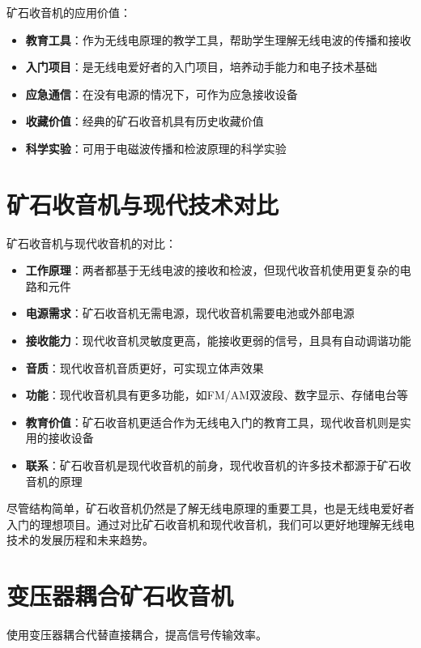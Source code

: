 \documentclass[12pt,UTF8]{ctexbook}
\begin{document}
矿石收音机的应用价值：
\begin{itemize}[leftmargin=3.5em]
    \item \textbf{教育工具}：作为无线电原理的教学工具，帮助学生理解无线电波的传播和接收
    \item \textbf{入门项目}：是无线电爱好者的入门项目，培养动手能力和电子技术基础
    \item \textbf{应急通信}：在没有电源的情况下，可作为应急接收设备
    \item \textbf{收藏价值}：经典的矿石收音机具有历史收藏价值
    \item \textbf{科学实验}：可用于电磁波传播和检波原理的科学实验
\end{itemize}

\chapter{矿石收音机与现代技术对比}

矿石收音机与现代收音机的对比：
\begin{itemize}[leftmargin=3.5em]
    \item \textbf{工作原理}：两者都基于无线电波的接收和检波，但现代收音机使用更复杂的电路和元件
    \item \textbf{电源需求}：矿石收音机无需电源，现代收音机需要电池或外部电源
    \item \textbf{接收能力}：现代收音机灵敏度更高，能接收更弱的信号，且具有自动调谐功能
    \item \textbf{音质}：现代收音机音质更好，可实现立体声效果
    \item \textbf{功能}：现代收音机具有更多功能，如FM/AM双波段、数字显示、存储电台等
    \item \textbf{教育价值}：矿石收音机更适合作为无线电入门的教育工具，现代收音机则是实用的接收设备
    \item \textbf{联系}：矿石收音机是现代收音机的前身，现代收音机的许多技术都源于矿石收音机的原理
\end{itemize}

尽管结构简单，矿石收音机仍然是了解无线电原理的重要工具，也是无线电爱好者入门的理想项目。通过对比矿石收音机和现代收音机，我们可以更好地理解无线电技术的发展历程和未来趋势。

\chapter{变压器耦合矿石收音机}

使用变压器耦合代替直接耦合，提高信号传输效率。
\end{document}
